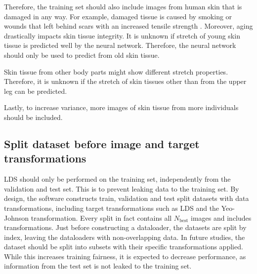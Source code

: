 Therefore, the training set should also include images from human skin that is damaged in any way.
For example, damaged tissue is caused by smoking \cite{Lipa2021} or wounds that left behind scars with an increased tensile strength \cite{Wilkinson2020}.
Moreover, aging drastically impacts skin tissue integrity.
It is unknown if stretch of young skin tissue is predicted well by the neural network.
Therefore, the neural network should only be used to predict from old skin tissue.

Skin tissue from other body parts might show different stretch properties.
Therefore, it is unknown if the stretch of skin tissues other than from the upper leg can be predicted.

Lastly, to increase variance, more images of skin tissue from more individuals should be included.

\subsection{Split dataset before image and target transformations}
LDS should only be performed on the training set, independently from the validation and test set.
This is to prevent leaking data to the training set.
By design, the software constructs train, validation and test split datasets with data transformations, including target transformations such as LDS and the Yeo-Johnson transformation.
Every split in fact contains all $N_\mathrm{best}$ images and includes transformations.
Just before constructing a dataloader, the datasets are split by index, leaving the dataloaders with non-overlapping data.
In future studies, the dataset should be split into subsets with their specific transformations applied.
While this increases training fairness, it is expected to decrease performance, as information from the test set is not leaked to the training set.

